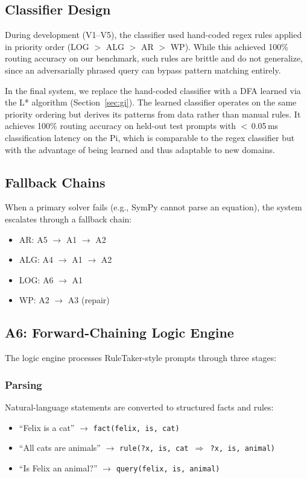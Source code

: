 \documentclass[journal]{IEEEtai}
\begin{document}
\subsection{Classifier Design}

During development (V1--V5), the classifier used hand-coded regex rules applied in priority order (LOG $>$ ALG $>$ AR $>$ WP). While this achieved 100\% routing accuracy on our benchmark, such rules are brittle and do not generalize, since an adversarially phrased query can bypass pattern matching entirely.

In the final system, we replace the hand-coded classifier with a DFA learned via the L* algorithm (Section~\ref{sec:gi}). The learned classifier operates on the same priority ordering but derives its patterns from data rather than manual rules. It achieves 100\% routing accuracy on held-out test prompts with $<$\,0.05\,ms classification latency on the Pi, which is comparable to the regex classifier but with the advantage of being learned and thus adaptable to new domains.

\subsection{Fallback Chains}

When a primary solver fails (e.g., SymPy cannot parse an equation), the system escalates through a fallback chain:
\begin{itemize}
    \item AR: A5 $\rightarrow$ A1 $\rightarrow$ A2
    \item ALG: A4 $\rightarrow$ A1 $\rightarrow$ A2
    \item LOG: A6 $\rightarrow$ A1
    \item WP: A2 $\rightarrow$ A3 (repair)
\end{itemize}

\subsection{A6: Forward-Chaining Logic Engine}
\label{sec:a6}

The logic engine processes RuleTaker-style prompts through three stages:

\subsubsection{Parsing} Natural-language statements are converted to structured facts and rules:
\begin{itemize}
    \item ``Felix is a cat'' $\rightarrow$ \texttt{fact(felix, is, cat)}
    \item ``All cats are animals'' $\rightarrow$ \texttt{rule(?x, is, cat $\Rightarrow$ ?x, is, animal)}
    \item ``Is Felix an animal?'' $\rightarrow$ \texttt{query(felix, is, animal)}
\end{itemize}
\end{document}
